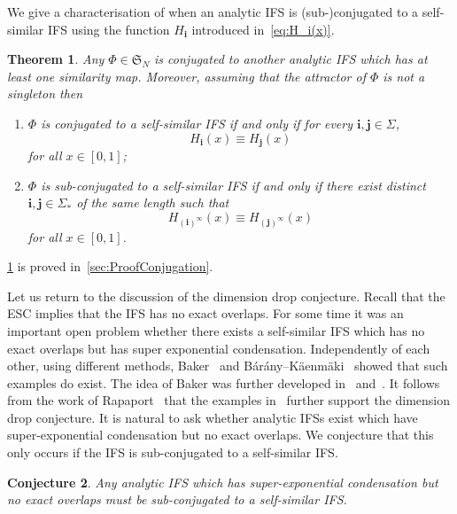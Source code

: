 \documentclass[12pt,]{article}
\def\cref#1{\ref{#1}}%
\newtheorem{theorem}{Theorem}[section]
\newtheorem{conjecture}[theorem]{Conjecture}
\theoremstyle{definition}
\theoremstyle{remark}
\newcommand{\0}{\mathbf{0}}
\newcommand{\bi}{\mathbf{i}}
\newcommand{\bj}{\mathbf{j}}
\begin{document}
We give a characterisation of when an analytic IFS is (sub-)conjugated to a self-similar IFS using
the function $H_{\bi}$ introduced in~\cref{eq:H_i(x)}.

\begin{theorem}\label{thm:SubConjugation}
  Any $\Phi\in\mathfrak{S}_N$ is conjugated to another analytic IFS which has at least one similarity map. 
  Moreover, assuming that the attractor of $\Phi$ is not a singleton then 
  \begin{enumerate}
    \item\label{it:conj1} $\Phi$ is conjugated to a self-similar IFS if and only if for every $\bi,\bj\in\Sigma$,
      \[
	H_{\bi}(x) \equiv H_{\bj}(x)
      \]
      for all $x\in[0,1]$;
    \item\label{it:conj2} $\Phi$ is sub-conjugated to a self-similar IFS if and only if there exist distinct $\bi,\bj\in\Sigma_*$
      of the same length such that 
      \[
	H_{(\bi)^\infty}(x) \equiv H_{(\bj)^\infty}(x)
      \]
      for all $x\in[0,1]$.
  \end{enumerate}
\end{theorem}
\cref{thm:SubConjugation} is proved in~\cref{sec:ProofConjugation}.


Let us return to the discussion of the dimension drop conjecture. Recall
that the ESC implies that the IFS has no exact overlaps. For some time it was an important open
problem whether there exists a self-similar IFS which has no exact overlaps but has super
exponential condensation. Independently of each other, using different methods,
Baker~\cite{Baker_SuperExpCloseIFS_AdvMath} and
B\'ar\'any--K\"{a}enm\"{a}ki~\cite{BaranyKaenmaki_SuperExpCLoseIFS} showed that such examples do
exist. The idea of Baker was further developed in~\cite{Baker_SuperExpCloseIFS2_ProcAMS}
and~\cite{Chen_SuperExpNoExactOVerlapExample}. It follows from the work of
Rapaport~\cite{Rapaport_ExactOverlapsAlgebraicContr} that the examples
in~\cite{Baker_SuperExpCloseIFS_AdvMath, Baker_SuperExpCloseIFS2_ProcAMS,
Chen_SuperExpNoExactOVerlapExample} further support the dimension drop conjecture. 
It is
natural to ask whether analytic IFSs exist which have super-exponential condensation but no exact
overlaps. We conjecture that this only occurs if the IFS is sub-conjugated to a self-similar IFS.

\begin{conjecture}
Any analytic IFS which has super-exponential condensation but no exact overlaps must be
sub-conjugated to a self-similar IFS.
\end{conjecture}
\end{document}
